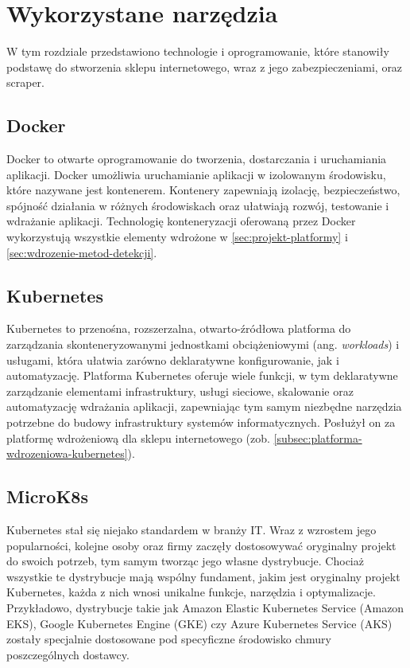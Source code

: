 \newpage

\section{Wykorzystane narzędzia}\label{sec:wykorzystane-narzedzia}

W tym rozdziale przedstawiono technologie i oprogramowanie, które stanowiły podstawę do stworzenia sklepu internetowego, wraz z jego zabezpieczeniami, oraz scraper.

\subsection{Docker}\label{subsec:docker}

Docker to otwarte oprogramowanie do tworzenia, dostarczania i uruchamiania aplikacji\cite{docker-overview}.
Docker umożliwia uruchamianie aplikacji w izolowanym środowisku, które nazywane jest kontenerem.
Kontenery zapewniają izolację, bezpieczeństwo, spójność działania w różnych środowiskach oraz ułatwiają rozwój, testowanie i wdrażanie aplikacji.
Technologię konteneryzacji oferowaną przez Docker wykorzystują wszystkie elementy wdrożone w \autoref{sec:projekt-platformy} i \autoref{sec:wdrozenie-metod-detekcji}.

\subsection{Kubernetes}\label{subsec:kubernetes}

Kubernetes to przenośna, rozszerzalna, otwarto-źródłowa platforma do zarządzania skonteneryzowanymi jednostkami obciążeniowymi (ang. \emph{workloads}) i usługami, która ułatwia zarówno deklaratywne konfigurowanie, jak i automatyzację\cite{kubernetes-overview}.
Platforma Kubernetes oferuje wiele funkcji, w tym deklaratywne zarządzanie elementami infrastruktury, usługi sieciowe, skalowanie oraz automatyzację wdrażania aplikacji, zapewniając tym samym niezbędne narzędzia potrzebne do budowy infrastruktury systemów informatycznych.
Posłużył on za platformę wdrożeniową dla sklepu internetowego (zob. \autoref{subsec:platforma-wdrozeniowa-kubernetes}).

\subsection{MicroK8s}\label{subsec:microk8s}

Kubernetes stał się niejako standardem w branży IT\@.
Wraz z wzrostem jego popularności, kolejne osoby oraz firmy zaczęły dostosowywać oryginalny projekt do swoich potrzeb, tym samym tworząc jego własne dystrybucje.
Chociaż wszystkie te dystrybucje mają wspólny fundament, jakim jest oryginalny projekt Kubernetes, każda z nich wnosi unikalne funkcje, narzędzia i optymalizacje.
Przykładowo, dystrybucje takie jak Amazon Elastic Kubernetes Service (Amazon EKS), Google Kubernetes Engine (GKE) czy Azure Kubernetes Service (AKS) zostały specjalnie dostosowane pod specyficzne środowisko chmury poszczególnych dostawcy.

